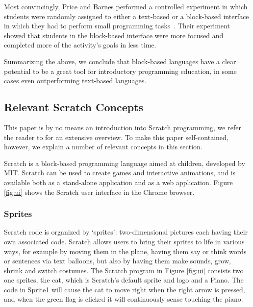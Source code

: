 \documentclass{sig-alternate}
\begin{document}
Most convincingly, Price and Barnes performed a controlled experiment in which students were randomly assigned to either a text-based or a block-based interface in  which they had to perform small programming tasks~\cite{price_comparing_2015}. Their experiment showed that students in the block-based interface were more focused and completed more of the activity's goals in less time.

Summarizing the above, we conclude that block-based languages have a clear potential to be a great tool for introductory programming education, in some cases even outperforming text-based languages.

\subsection{Relevant Scratch Concepts}
\label{sec:scratch}
This paper is by no means an introduction into Scratch programming, we refer the reader to \cite{brennan_creative_2014} for an extensive overview. To make this paper self-contained, however, we explain a number of relevant concepts in this section. 

Scratch is a block-based programming language aimed at children, developed by MIT. Scratch can be used to create games and interactive animations, and is available both as a stand-alone application and as a web application. Figure \ref{fig:ui} shows the Scratch user interface in the Chrome browser.

\subsubsection{Sprites}
Scratch code is organized by `sprites': two-dimensional pictures each having their own associated code. Scratch allows users to bring their sprites to life in various ways, for example by moving them in the plane, having them say or think words or sentences via text balloons, but also by having them make sounds, grow, shrink and switch costumes. The Scratch program in Figure \ref{fig:ui} consists two one sprites, the cat, which is Scratch's default sprite and logo and a Piano. The code in Sprite1 will cause the cat to move right when the right arrow is pressed, and when the green flag is clicked it will continuously sense touching the piano.
\end{document}
